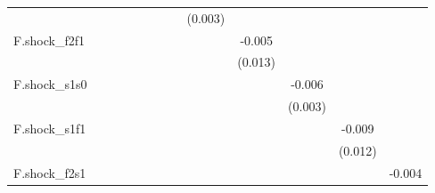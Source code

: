 {\begin{tabular}{l*{12}{c}}
            &                     &                     &                     &                     &                     &                     &                     &     (0.003)         &                     &                     &                     &                     \\
\addlinespace
F.shock\_f2f1&                     &                     &                     &                     &                     &                     &                     &                     &      -0.005         &                     &                     &                     \\
            &                     &                     &                     &                     &                     &                     &                     &                     &     (0.013)         &                     &                     &                     \\
\addlinespace
F.shock\_s1s0&                     &                     &                     &                     &                     &                     &                     &                     &                     &      -0.006\sym{*}  &                     &                     \\
            &                     &                     &                     &                     &                     &                     &                     &                     &                     &     (0.003)         &                     &                     \\
\addlinespace
F.shock\_s1f1&                     &                     &                     &                     &                     &                     &                     &                     &                     &                     &      -0.009         &                     \\
            &                     &                     &                     &                     &                     &                     &                     &                     &                     &                     &     (0.012)         &                     \\
\addlinespace
F.shock\_f2s1&                     &                     &                     &                     &                     &                     &                     &                     &                     &                     &                     &      -0.004         \\

\end{tabular}}
